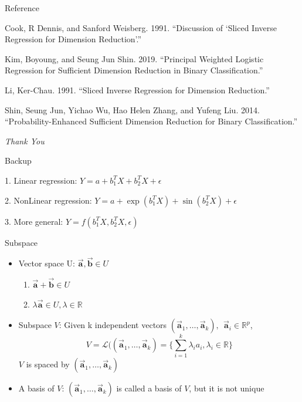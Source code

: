 \documentclass[ignorenonframetext,]{beamer}
\providecommand{\tightlist}{%
  \setlength{\itemsep}{0pt}\setlength{\parskip}{0pt}}
\begin{document}
\begin{frame}{Reference}

\hypertarget{refs}{}
\hypertarget{ref-ref7}{}
Cook, R Dennis, and Sanford Weisberg. 1991. ``Discussion of `Sliced
Inverse Regression for Dimension Reduction'.''

\hypertarget{ref-ref9}{}
Kim, Boyoung, and Seung Jun Shin. 2019. ``Principal Weighted Logistic
Regression for Sufficient Dimension Reduction in Binary
Classification.''

\hypertarget{ref-ref6}{}
Li, Ker-Chau. 1991. ``Sliced Inverse Regression for Dimension
Reduction.''

\hypertarget{ref-ref8}{}
Shin, Seung Jun, Yichao Wu, Hao Helen Zhang, and Yufeng Liu. 2014.
``Probability-Enhanced Sufficient Dimension Reduction for Binary
Classification.''

\end{frame}

\begin{frame}{}

\centering \Huge
 \emph{Thank You}

\end{frame}

\begin{frame}{Backup}

\begin{examples}

1. Linear regression: $Y = a + b_1^TX + b_2^TX + \epsilon$

2. NonLinear regression: $Y = a + \exp(b_1^TX) + \sin(b_2^TX) + \epsilon$

3. More general: $Y = f(b_1^TX, b_2^TX, \epsilon)$
\end{examples}

\end{frame}

\begin{frame}{Subspace}

\begin{itemize}
\item
  Vector space U: \(\vec{\mathbf{a}}, \vec{\mathbf{b}} \in U\)

  \begin{enumerate}
  \def\labelenumi{\arabic{enumi}.}
  \tightlist
  \item
    \(\vec{\mathbf{a}} + \vec{\mathbf{b}} \in U\)\\
  \item
    \(\lambda \vec{\mathbf{a}} \in U, \lambda \in \mathbb{R}\)
  \end{enumerate}
\item
  Subspace \(V\): Given k independent vectors
  \((\vec{\mathbf{a}}_1, \dots, \vec{\mathbf{a}}_k), ~~\vec{\mathbf{a}}_i \in \mathbb{R}^p\),
  \[
  V = \mathcal{L}((\vec{\mathbf{a}}_1, \dots, \vec{\mathbf{a}}_k) = \{\sum_{i = 1}^k\lambda_ia_i, \lambda_i\in \mathbb{R}\}
  \] \(V\) is spaced by
  \((\vec{\mathbf{a}}_1, \dots, \vec{\mathbf{a}}_k)\)
\item
  A basis of \(V\): \((\vec{\mathbf{a}}_1, \dots, \vec{\mathbf{a}}_k)\)
  is called a basis of \(V\), but it is not unique
\end{itemize}

\end{frame}
\end{document}
